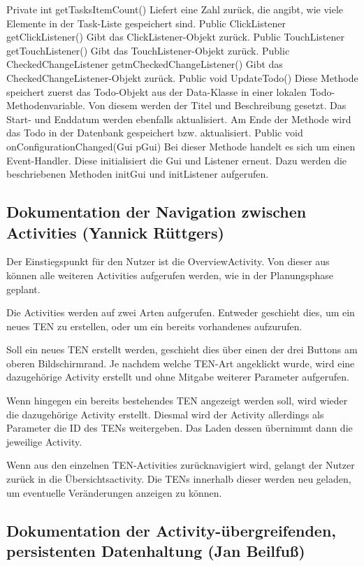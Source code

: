 Private int getTasksItemCount()
Liefert eine Zahl zurück, die angibt, wie viele Elemente in der Task-Liste gespeichert sind.
Public ClickListener getClickListener()
Gibt das ClickListener-Objekt zurück.
Public TouchListener getTouchListener()
	Gibt das TouchListener-Objekt zurück.
Public CheckedChangeListener getmCheckedChangeListener()
	Gibt das CheckedChangeListener-Objekt zurück.
Public void UpdateTodo()
Diese Methode speichert zuerst das Todo-Objekt aus der Data-Klasse in einer lokalen Todo-Methodenvariable. Von diesem werden der Titel und Beschreibung gesetzt. Das Start- und Enddatum werden ebenfalls aktualisiert. Am Ende der Methode wird das Todo in der Datenbank gespeichert bzw. aktualisiert.
Public void onConfigurationChanged(Gui pGui)
Bei dieser Methode handelt es sich um einen Event-Handler. Diese initialisiert die Gui und Listener erneut. Dazu werden die beschriebenen Methoden initGui und initListener aufgerufen.

\subsection{Dokumentation der Navigation zwischen Activities (Yannick Rüttgers)}

Der Einstiegspunkt für den Nutzer ist die OverviewActivity. Von dieser aus können alle weiteren Activities aufgerufen werden, wie in der Planungsphase geplant.

Die Activities werden auf zwei Arten aufgerufen. Entweder geschieht dies, um ein neues TEN zu erstellen, oder um ein bereits vorhandenes aufzurufen.

Soll ein neues TEN erstellt werden, geschieht dies über einen der drei Buttons am oberen Bildschirmrand. Je nachdem welche TEN-Art angeklickt wurde, wird eine dazugehörige Activity erstellt und ohne Mitgabe weiterer Parameter aufgerufen.

Wenn hingegen ein bereits bestehendes TEN angezeigt werden soll, wird wieder die dazugehörige Activity erstellt. Diesmal wird der Activity allerdings als Parameter die ID des TENs weitergeben. Das Laden dessen übernimmt dann die jeweilige Activity.

Wenn aus den einzelnen TEN-Activities zurücknavigiert wird, gelangt der Nutzer zurück in die Übersichtsactivity. Die TENs innerhalb dieser werden neu geladen, um eventuelle Veränderungen anzeigen zu können.

\subsection{Dokumentation der Activity-übergreifenden, persistenten Datenhaltung (Jan Beilfuß)}

